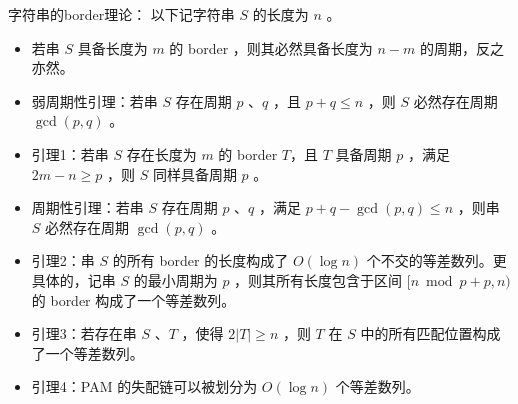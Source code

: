 \inputminted{cpp}{src/string/kmp.cpp}
字符串的border理论：
以下记字符串 $S$ 的长度为 $n$ 。
\begin{itemize}
    \item 若串 $S$ 具备长度为 $m$ 的 border ，则其必然具备长度为 $n-m$ 的周期，反之亦然。
    \item 弱周期性引理：若串 $S$ 存在周期 $p$ 、$q$ ，且 $p+q\le n$ ，则 $S$ 必然存在周期 $\gcd(p,q)$ 。
    \item 引理1：若串 $S$ 存在长度为 $m$ 的 border $T$，且 $T$ 具备周期 $p$ ，满足 $2m-n\ge p$ ，则 $S$ 同样具备周期 $p$ 。
    \item 周期性引理：若串 $S$ 存在周期 $p$ 、$q$ ，满足 $p+q-\gcd(p,q)\le n$ ，则串 $S$ 必然存在周期 $\gcd(p,q)$ 。
    \item 引理2：串 $S$ 的所有 border 的长度构成了 $O(\log n)$ 个不交的等差数列。更具体的，记串 $S$ 的最小周期为 $p$ ，则其所有长度包含于区间 $[n \bmod p + p, n)$ 的 border 构成了一个等差数列。
    \item 引理3：若存在串 $S$ 、$T$ ，使得 $2|T|\ge n$ ，则 $T$ 在 $S$ 中的所有匹配位置构成了一个等差数列。
    \item 引理4：PAM 的失配链可以被划分为 $O(\log n)$ 个等差数列。
\end{itemize}